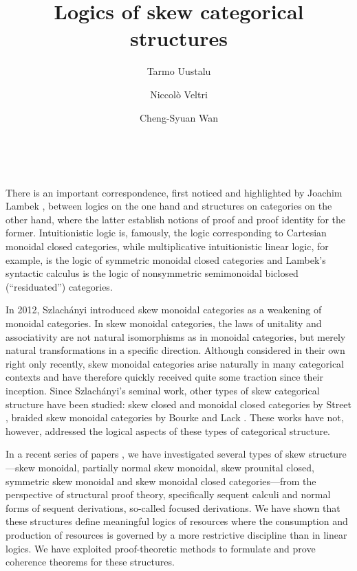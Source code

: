 \documentclass{article}
\begin{document}
\title{Logics of skew categorical structures}

\author{Tarmo Uustalu \and Niccol\`o Veltri \and Cheng-Syuan Wan}

\date{~}

\maketitle

\thispagestyle{empty}

There is an important correspondence, first noticed and highlighted by
Joachim Lambek \cite{Lam}, between logics on the one hand and structures on
categories on the other hand, where the latter establish notions of
proof and proof identity for the former. Intuitionistic logic is,
famously, the logic corresponding to Cartesian monoidal closed
categories, while multiplicative intuitionistic linear logic, for
example, is the logic of symmetric monoidal closed categories and
Lambek's syntactic calculus is the logic of nonsymmetric semimonoidal
biclosed (``residuated'') categories.

In 2012, Szlach\'anyi \cite{Szl} introduced skew monoidal categories
as a weakening of monoidal categories. In skew monoidal categories,
the laws of unitality and associativity are not natural isomorphisms
as in monoidal categories, but merely natural transformations in a
specific direction. Although considered in their own right only
recently, skew monoidal categories arise naturally in many categorical
contexts and have therefore quickly received quite some traction since
their inception. Since Szlach\'anyi's seminal work, other types of
skew categorical structure have been studied: skew closed and monoidal
closed categories by Street \cite{Str}, braided skew monoidal
categories by Bourke and Lack \cite{BL}. These works have not,
however, addressed the logical aspects of these types of categorical
structure.

In a recent series of papers
\cite{UVZ:lambek,UVZ:skpcl,UVZ:pn,Vel:ss,UVW}, we have investigated
several types of skew structure---skew monoidal, partially normal skew
monoidal, skew prounital closed, symmetric skew monoidal and skew
monoidal closed categories---from the perspective of structural proof
theory, specifically sequent calculi and normal forms of sequent
derivations, so-called focused derivations. We have shown that these
structures define meaningful logics of resources where the consumption
and production of resources is governed by a more restrictive
discipline than in linear logics. We have exploited proof-theoretic
methods to formulate and prove coherence theorems for these
structures.
\end{document}
